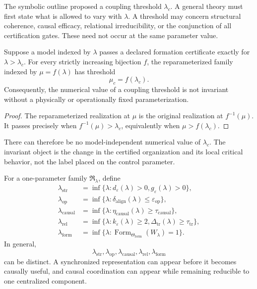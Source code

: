 

The symbolic outline proposed a coupling threshold \(\lambda_c\). A general
theory must first state what is allowed to vary with \(\lambda\). A threshold
may concern structural coherence, causal efficacy, relational irreducibility,
or the conjunction of all certification gates. These need not occur at the
same parameter value.


\begin{proposition}
\label{prop:threshold-reparam}
Suppose a model indexed by \(\lambda\) passes a declared formation certificate
exactly for \(\lambda>\lambda_c\). For every strictly increasing bijection
\(f\), the reparameterized family indexed by \(\mu=f(\lambda)\) has threshold
\[
\mu_c=f(\lambda_c).
\]
Consequently, the numerical value of a coupling threshold is not invariant
without a physically or operationally fixed parameterization.
\end{proposition}

\begin{proof}
The reparameterized realization at \(\mu\) is the original realization at
\(f^{-1}(\mu)\). It passes precisely when
\(f^{-1}(\mu)>\lambda_c\), equivalently when
\(\mu>f(\lambda_c)\).
\end{proof}

There can therefore be no model-independent numerical value of \(\lambda_c\).
The invariant object is the change in the certified organization and its local
critical behavior, not the label placed on the control parameter.


For a one-parameter family \(\mathfrak R_\lambda\), define
\[
\begin{aligned}
\lambda_{\mathrm{str}}
&=
\inf\{\lambda:
 d_{\varepsilon}(\lambda)>0,
 g_{\varepsilon}(\lambda)>0\},\\
\lambda_{\mathrm{op}}
&=
\inf\{\lambda:
 \delta_{\mathrm{align}}(\lambda)
 \leq\varepsilon_{\mathrm{op}}\},\\
\lambda_{\mathrm{causal}}
&=
\inf\{\lambda:
 \eta_{\mathrm{causal}}(\lambda)
 \geq\tau_{\mathrm{causal}}\},\\
\lambda_{\mathrm{rel}}
&=
\inf\{\lambda:
 k_\varepsilon(\lambda)\geq2,
 \Delta_{\mathrm{tr}}(\lambda)
 \geq\tau_{\mathrm{tr}}\},\\
\lambda_{\mathrm{form}}
&=
\inf\{\lambda:
 \operatorname{Form}_{\Theta_{\mathrm{form}}}
 (W_\lambda)=1\}.
\end{aligned}
\]
In general,
\[
\lambda_{\mathrm{str}},
\lambda_{\mathrm{op}},
\lambda_{\mathrm{causal}},
\lambda_{\mathrm{rel}},
\lambda_{\mathrm{form}}
\]
can be distinct. A synchronized representation can appear before it becomes
causally useful, and causal coordination can appear while remaining reducible
to one centralized component.

